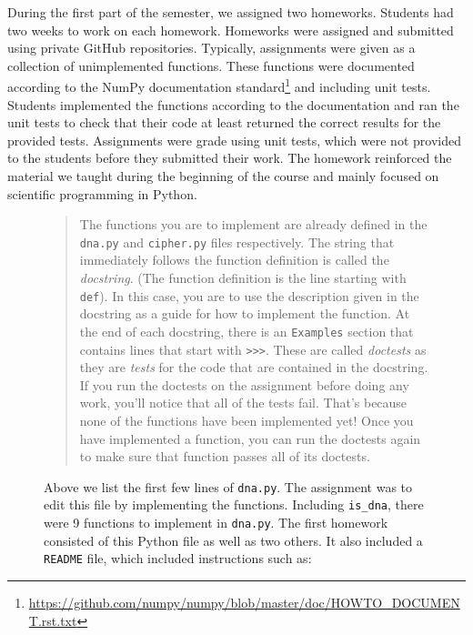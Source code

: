 


During the first part of the semester, we assigned two homeworks.
Students had two weeks to work on each homework.
Homeworks were assigned and submitted using private GitHub repositories.
Typically, assignments were given as a collection of unimplemented
functions.
These functions were documented according to the NumPy documentation
standard\footnote{\url{https://github.com/numpy/numpy/blob/master/doc/HOWTO_DOCUMENT.rst.txt}}
and including unit tests.
Students implemented the functions according to the documentation
and ran the unit tests to check that their code at least
returned the correct results for the provided tests.
Assignments were grade using unit tests, which were not provided to
the students before they submitted their work.
The homework reinforced the material we taught during the
beginning of the course and mainly focused on scientific programming
in Python.


\begin{figure}
\centering

\caption{Above we list the first few lines of \texttt{dna.py}.
The assignment was to edit this file by implementing the functions.
Including \texttt{is\_dna}, there were 9 functions
to implement in \texttt{dna.py}.
The first homework consisted of this Python file as well as two others.
It also included a \texttt{README} file, which included instructions
such as:}\label{fig:dna}
\begin{quotation}
The functions you are to implement are already defined in the \texttt{dna.py} and
\texttt{cipher.py} files respectively. The string that immediately follows the function
definition is called the \emph{docstring}. (The function definition is the line
starting with \texttt{def}). In this case, you are to use the description given in the
docstring as a guide for how to implement the function. At the end of each
docstring, there is an \texttt{Examples} section that contains lines that start with
\verb|>>>|. These are called \emph{doctests} as they are \emph{tests} for the code that are
contained in the docstring. If you run the doctests on the assignment before
doing any work, you'll notice that all of the tests fail. That's because none
of the functions have been implemented yet! Once you have implemented a
function, you can run the doctests again to make sure that function passes all
of its doctests.
\end{quotation}
\end{figure}

